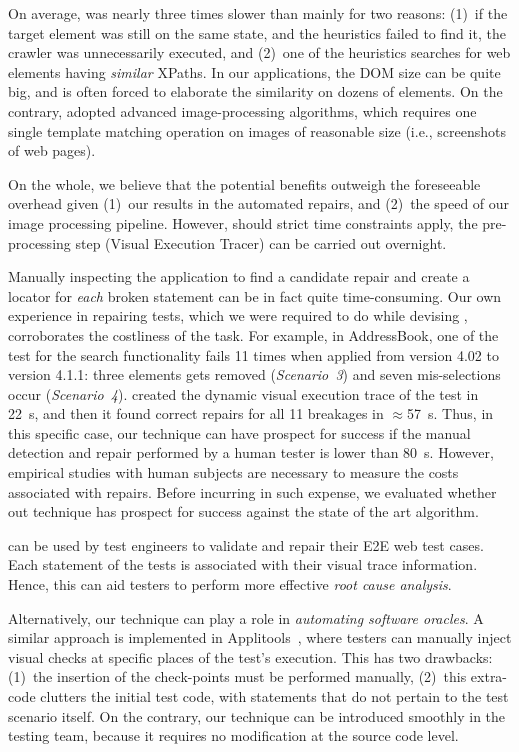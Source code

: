 On average, \water was nearly three times slower than \tool mainly for two reasons: (1)~if the target element was still on the same state, and the heuristics failed to find it, the crawler was unnecessarily executed, and (2)~one of the heuristics searches for web elements having \textit{similar} XPaths. In our applications, the DOM size can be quite big, and \water is often forced to elaborate the similarity on dozens of elements. On the contrary, \tool adopted advanced image-processing algorithms, which requires one single template matching operation on images of reasonable size (i.e., screenshots of web pages).

On the whole, we believe that the potential benefits outweigh the foreseeable overhead given (1)~our results in the automated repairs, and (2)~the speed of our image processing pipeline. However, should strict time constraints apply, the pre-processing step (Visual Execution Tracer) can be carried out overnight.

Manually inspecting the application to find a candidate repair  and create a locator for \textit{each} broken statement can be in fact quite time-consuming. Our own experience in repairing tests, which we were required to do while devising \tool, corroborates the costliness of the task. For example, in AddressBook, one of the test for the search functionality fails 11 times when applied from version 4.02 to version 4.1.1: three elements gets removed (\textit{Scenario~3}) and seven mis-selections occur (\textit{Scenario~4}). \tool created the dynamic visual execution trace of the test in 22~s, and then it found correct repairs for all 11 breakages in $\approx$57~s. Thus, in this specific case, our technique can have prospect for success if the manual detection and repair performed by a human tester is lower than 80~s. However, empirical studies with human subjects are necessary to measure the costs associated with repairs. Before incurring in such expense, we evaluated whether out technique has prospect for success against the state of the art algorithm.

\tool can be used by test engineers to validate and repair their E2E web test cases. Each statement of the tests is associated with their visual trace information. Hence, this can aid testers to perform more effective \textit{root cause analysis}.

Alternatively, our technique can play a role in \textit{automating software oracles}. A similar approach is implemented in Applitools~\cite{applitools}, where testers can manually inject visual checks at specific places of the test's execution. This has two drawbacks: (1)~the insertion of the check-points must be performed manually, (2)~this extra-code clutters the initial test code, with statements that do not pertain to the test scenario itself. On the contrary, our technique can be introduced smoothly in the testing team, because it requires no modification at the source code level. 

